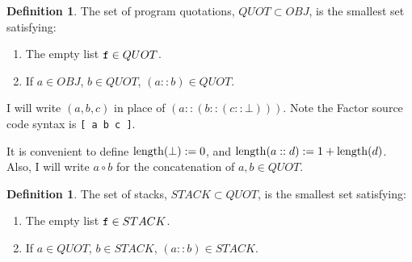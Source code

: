 \documentclass{amsart}
\theoremstyle{plain}
\theoremstyle{definition}
\newtheorem{definition}[theorem]{Definition}
\def\leng{\mathop{\rm length}}
\begin{document}
\begin{definition}
The set of program quotations, $QUOT \subset OBJ$, is the smallest set satisfying:

\begin{enumerate}

\item The empty list $\mbox{\texttt{f}} \in QUOT$.
\item If $a \in OBJ$, $b \in QUOT$, $(a::b) \in QUOT$.

\end{enumerate}

I will write $(a,b,c)$ in place of $(a::(b::(c::\bot)))$. Note the Factor source code
syntax is \texttt{[ a b c ]}.

It is convenient to define $\leng(\bot) := 0$, and $\leng(a::d):=1+\leng(d)$. Also, I will write $a\circ b$ for the concatenation of $a,b \in QUOT$.

\end{definition}

\begin{definition}
The set of stacks, $STACK \subset QUOT$, is the smallest set satisfying:

\begin{enumerate}

\item The empty list $\mbox{\texttt{f}} \in STACK$.
\item If $a \in QUOT$, $b \in STACK$, $(a::b) \in STACK$.

\end{enumerate}

\end{definition}
\end{document}

